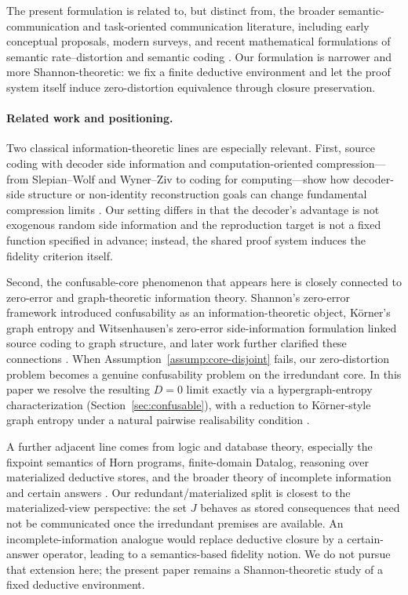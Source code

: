 \documentclass[journal,onecolumn]{IEEEtran}
\numberwithin{equation}{section}
\begin{document}
The present formulation is related to, but distinct from, the broader
semantic-communication and task-oriented communication literature,
including early conceptual proposals\cite{carnap1952outline}, modern surveys\cite{gunduz2022beyond}, and recent
mathematical formulations of semantic rate--distortion and semantic
coding
\cite{liu2022indirect,niu2024mathematical,zhao2025semantic,
han2025extended,ma2025theory}.
Our formulation is narrower and more Shannon-theoretic: we fix a
finite deductive environment and let the proof system itself induce
zero-distortion equivalence through closure preservation.

\paragraph*{Related work and positioning.}
Two classical information-theoretic lines are especially relevant.
First, source coding with decoder side information and
computation-oriented compression---from Slepian--Wolf and Wyner--Ziv
to coding for computing---show how decoder-side structure or
non-identity reconstruction goals can change fundamental compression
limits \cite{slepian1973noiseless,wyner1976rate,orlitsky2001coding}.
Our setting differs in that the decoder's advantage is not exogenous
random side information and the reproduction target is not a fixed
function specified in advance; instead, the shared proof system
induces the fidelity criterion itself.

Second, the confusable-core phenomenon that appears here is closely
connected to zero-error and graph-theoretic information theory.
Shannon's zero-error framework introduced confusability as an
information-theoretic object, K\"orner's graph entropy and
Witsenhausen's zero-error side-information formulation linked source
coding to graph structure, and later work further clarified these
connections \cite{shannon1956zero,korner1986fredman,witsenhausen1976zero,alon1996source}.
When Assumption~\ref{assump:core-disjoint} fails, our zero-distortion
problem becomes a genuine confusability problem on the irredundant core.
In this paper we resolve the resulting \(D=0\) limit exactly via a
hypergraph-entropy characterization (Section~\ref{sec:confusable}),
with a reduction to K\"orner-style graph entropy under a natural
pairwise realisability condition \cite{korner1971coding,alon1996source,orlitsky2001coding}.

A further adjacent line comes from logic and database theory,
especially the fixpoint semantics of Horn programs, finite-domain
Datalog, reasoning over materialized deductive stores, and the broader
theory of incomplete information and certain answers
\cite{van1976semantics,ceri1989you,abiteboul1995foundations,
dantsin2001complexity,hu2019datalog,gupta1995maintenance,
gupta1998materialized}.
Our redundant/materialized split is closest to the materialized-view
perspective: the set \(J\) behaves as stored consequences that need
not be communicated once the irredundant premises are available. An
incomplete-information analogue would replace deductive closure by a
certain-answer operator, leading to a semantics-based fidelity notion.
We do not pursue that extension here; the present paper remains a
Shannon-theoretic study of a fixed deductive environment.
\end{document}
